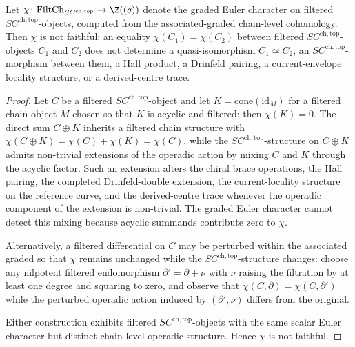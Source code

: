 \begin{lemma}
\label{lem:scalar-non-faithfulness-vol3}
Let $\chi \colon \mathrm{FiltCh}_{SC^{\mathrm{ch}, \mathrm{top}}} \to \Z((q))$ denote the graded Euler character on filtered $SC^{\mathrm{ch}, \mathrm{top}}$-objects, computed from the associated-graded chain-level cohomology. Then $\chi$ is not faithful: an equality $\chi(C_1) = \chi(C_2)$ between filtered $SC^{\mathrm{ch}, \mathrm{top}}$-objects $C_1$ and $C_2$ does not determine a quasi-isomorphism $C_1 \simeq C_2$, an $SC^{\mathrm{ch}, \mathrm{top}}$-morphism between them, a Hall product, a Drinfeld pairing, a current-envelope locality structure, or a derived-centre trace.
\end{lemma}

\begin{proof}
Let $C$ be a filtered $SC^{\mathrm{ch}, \mathrm{top}}$-object and let $K = \mathrm{cone}(\mathrm{id}_M)$ for a filtered chain object $M$ chosen so that $K$ is acyclic and filtered; then $\chi(K) = 0$. The direct sum $C \oplus K$ inherits a filtered chain structure with $\chi(C \oplus K) = \chi(C) + \chi(K) = \chi(C)$, while the $SC^{\mathrm{ch}, \mathrm{top}}$-structure on $C \oplus K$ admits non-trivial extensions of the operadic action by mixing $C$ and $K$ through the acyclic factor. Such an extension alters the chiral brace operations, the Hall pairing, the completed Drinfeld-double extension, the current-locality structure on the reference curve, and the derived-centre trace whenever the operadic component of the extension is non-trivial. The graded Euler character cannot detect this mixing because acyclic summands contribute zero to $\chi$.

Alternatively, a filtered differential on $C$ may be perturbed within the associated graded so that $\chi$ remains unchanged while the $SC^{\mathrm{ch}, \mathrm{top}}$-structure changes: choose any nilpotent filtered endomorphism $\partial' = \partial + \nu$ with $\nu$ raising the filtration by at least one degree and squaring to zero, and observe that $\chi(C, \partial) = \chi(C, \partial')$ while the perturbed operadic action induced by $(\partial', \nu)$ differs from the original.

Either construction exhibits filtered $SC^{\mathrm{ch}, \mathrm{top}}$-objects with the same scalar Euler character but distinct chain-level operadic structure. Hence $\chi$ is not faithful.
\end{proof}

